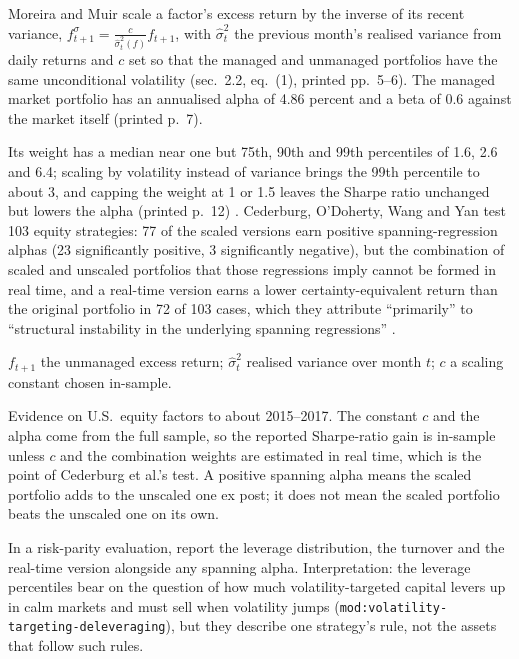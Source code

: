 \begin{qfevidence}\label{ev:volatility-managed-portfolios}
 Moreira and Muir scale a factor's excess return by the inverse of its recent variance, $f^\sigma_{t+1}=\frac{c}{\hat\sigma^2_t(f)}f_{t+1}$, with $\hat\sigma^2_t$ the previous month's realised variance from daily returns and $c$ set so that the managed and unmanaged portfolios have the same unconditional volatility (sec.~2.2, eq.~(1), printed pp.~5--6). The managed market portfolio has an annualised alpha of 4.86 percent and a beta of 0.6 against the market itself (printed p.~7).

Its weight has a median near one but 75th, 90th and 99th percentiles of 1.6, 2.6 and 6.4; scaling by volatility instead of variance brings the 99th percentile to about 3, and capping the weight at 1 or 1.5 leaves the Sharpe ratio unchanged but lowers the alpha (printed p.~12) \citep[NBER WP~22208, 2016, secs.~2.2 and~5, printed pp.~5--12]{s16-r25}. Cederburg, O'Doherty, Wang and Yan test 103 equity strategies: 77 of the scaled versions earn positive spanning-regression alphas (23 significantly positive, 3 significantly negative), but the combination of scaled and unscaled portfolios that those regressions imply cannot be formed in real time, and a real-time version earns a lower certainty-equivalent return than the original portfolio in 72 of 103 cases, which they attribute ``primarily'' to ``structural instability in the underlying spanning regressions'' \citep[\emph{JFE} 138, 2020, abstract and sec.~1, pp.~95--97]{wide-cederburg-volmanaged}.

 $f_{t+1}$ the unmanaged excess return; $\hat\sigma^2_t$ realised variance over month $t$; $c$ a scaling constant chosen in-sample.

 Evidence on U.S.\ equity factors to about 2015--2017. The constant $c$ and the alpha come from the full sample, so the reported Sharpe-ratio gain is in-sample unless $c$ and the combination weights are estimated in real time, which is the point of Cederburg et al.'s test. A positive spanning alpha means the scaled portfolio adds to the unscaled one ex post; it does not mean the scaled portfolio beats the unscaled one on its own.

 In a risk-parity evaluation, report the leverage distribution, the turnover and the real-time version alongside any spanning alpha. Interpretation: the leverage percentiles bear on the question of how much volatility-targeted capital levers up in calm markets and must sell when volatility jumps (\nolinkurl{mod:volatility-targeting-deleveraging}), but they describe one strategy's rule, not the assets that follow such rules.


\end{qfevidence}
